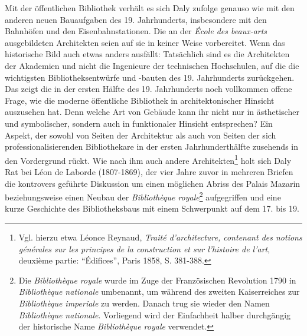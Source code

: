 Mit der öffentlichen Bibliothek verhält es sich Daly zufolge genauso wie
mit den anderen neuen Bauaufgaben des 19. Jahrhunderts, insbesondere mit
den Bahnhöfen und den Eisenbahnstationen. Die an der \emph{École des
beaux-arts} ausgebildeten Architekten seien auf sie in keiner Weise
vorbereitet. Wenn das historische Bild auch etwas anders ausfällt:
Tatsächlich sind es die Architekten der Akademien und nicht die
Ingenieure der technischen Hochschulen, auf die die wichtigsten
Bibliotheksentwürfe und -bauten des 19. Jahrhunderts zurückgehen. Das
zeigt die in der ersten Hälfte des 19. Jahrhunderts noch vollkommen
offene Frage, wie die moderne öffentliche Bibliothek in
architektonischer Hinsicht auszusehen hat. Denn welche Art von Gebäude
kann ihr nicht nur in ästhetischer und symbolischer, sondern auch in
funktionaler Hinsicht entsprechen? Ein Aspekt, der sowohl von Seiten der
Architektur als auch von Seiten der sich professionalisierenden
Bibliothekare in der ersten Jahrhunderthälfte zusehends in den
Vordergrund rückt. Wie nach ihm auch andere Architekten\footnote{Vgl.
  hierzu etwa Léonce Reynaud, \emph{Traité d'architecture, contenant des
  notions générales sur les principes de la construction et sur
  l'histoire de l'art}, deuxième partie: \enquote{Édifices}, Paris 1858,
  S. 381-388.} holt sich Daly Rat bei Léon de Laborde (1807-1869), der
vier Jahre zuvor in mehreren Briefen die kontrovers geführte Diskussion
um einen möglichen Abriss des Palais Mazarin beziehungsweise einen
Neubau der \emph{Bibliothèque royale}\footnote{Die \emph{Bibliothèque
  royale} wurde im Zuge der Französischen Revolution 1790 in
  \emph{Bibliothèque nationale} umbenannt, um während des zweiten
  Kaiserreiches zur \emph{Bibliothèque imperiale} zu werden. Danach trug
  sie wieder den Namen \emph{Bibliothèque nationale}. Vorliegend wird
  der Einfachheit halber durchgängig der historische Name
  \emph{Bibliothèque royale} verwendet.} aufgegriffen und eine kurze
Geschichte des Bibliotheksbaus mit einem Schwerpunkt auf dem 17. bis 19.
